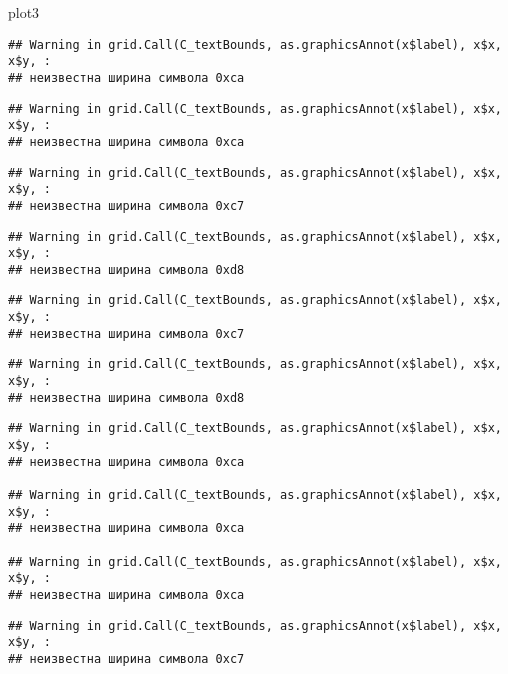 \documentclass[
]{article}
\newenvironment{Shaded}{\begin{snugshade}}{\end{snugshade}}
\newcommand{\NormalTok}[1]{#1}
\begin{document}
\begin{Shaded}
\begin{Highlighting}[]
\NormalTok{plot3}
\end{Highlighting}
\end{Shaded}

\begin{verbatim}
## Warning in grid.Call(C_textBounds, as.graphicsAnnot(x$label), x$x, x$y, :
## неизвестна ширина символа 0xca
\end{verbatim}

\begin{verbatim}
## Warning in grid.Call(C_textBounds, as.graphicsAnnot(x$label), x$x, x$y, :
## неизвестна ширина символа 0xca
\end{verbatim}

\begin{verbatim}
## Warning in grid.Call(C_textBounds, as.graphicsAnnot(x$label), x$x, x$y, :
## неизвестна ширина символа 0xc7
\end{verbatim}

\begin{verbatim}
## Warning in grid.Call(C_textBounds, as.graphicsAnnot(x$label), x$x, x$y, :
## неизвестна ширина символа 0xd8
\end{verbatim}

\begin{verbatim}
## Warning in grid.Call(C_textBounds, as.graphicsAnnot(x$label), x$x, x$y, :
## неизвестна ширина символа 0xc7
\end{verbatim}

\begin{verbatim}
## Warning in grid.Call(C_textBounds, as.graphicsAnnot(x$label), x$x, x$y, :
## неизвестна ширина символа 0xd8
\end{verbatim}

\begin{verbatim}
## Warning in grid.Call(C_textBounds, as.graphicsAnnot(x$label), x$x, x$y, :
## неизвестна ширина символа 0xca

## Warning in grid.Call(C_textBounds, as.graphicsAnnot(x$label), x$x, x$y, :
## неизвестна ширина символа 0xca

## Warning in grid.Call(C_textBounds, as.graphicsAnnot(x$label), x$x, x$y, :
## неизвестна ширина символа 0xca
\end{verbatim}

\begin{verbatim}
## Warning in grid.Call(C_textBounds, as.graphicsAnnot(x$label), x$x, x$y, :
## неизвестна ширина символа 0xc7
\end{verbatim}
\end{document}
